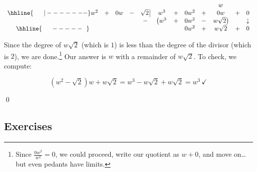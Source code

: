 \begin{ex}
\begin{enumerate}
\setlength\arraycolsep{0.1pt}
\setlength\extrarowheight{2pt}

\[ \begin{array}{cccccccccccc}

    &   &    &   &                    &     &   &      &   &  w &   & \\ \hhline{~~~~~|-------}

w^2 & + & 0w & - & \sqrt{2} \, \vline & w^3 & + & 0w^2 & + & 0w & + & 0  \\
    
		&   &    &    &                  -&\left(w^3\vphantom{w\sqrt{2}} \right. & + & 0w^2 & - & \left.  w\sqrt{2} \right) & & \downarrow \\ \hhline{~~~~~-----~~}
    &   &    &    &                   &                                       &  &  0w^2     &  + &   w\sqrt{2}  & + & 0\\ 
 
\end{array}\]
\setlength\arraycolsep{5pt}
\setlength\extrarowheight{0pt}

Since the degree of $w\sqrt{2}$ (which is $1$) is less than the degree of the divisor (which is $2$), we are done.\footnote{Since $\frac{0w^2}{w^2} = 0$, we could proceed, write our quotient as $w+0$, and move on\ldots but even pedants have limits.}  Our answer is $w$ with a remainder of $w \sqrt{2}$.  To check, we compute:

\[ \left(w^2 - \sqrt{2}\right)w + w\sqrt{2} = w^3 - w\sqrt{2} + w\sqrt{2} = w^3 \, \checkmark\]

\vspace{-0.3in}\qed

\end{enumerate}

\end{ex}

\newpage

\subsection{Exercises}



\closegraphsfile